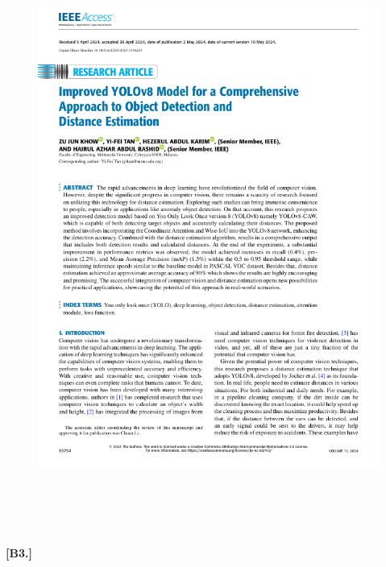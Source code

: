 \begin{figure}[h!]
    \centering
    \includegraphics[width=1\textwidth]{reference_papers/Paper_2(Base Paper).png}
\end{figure}
%
%
\\\\\\\\
\textbf{[B3.]}
%
%
%
